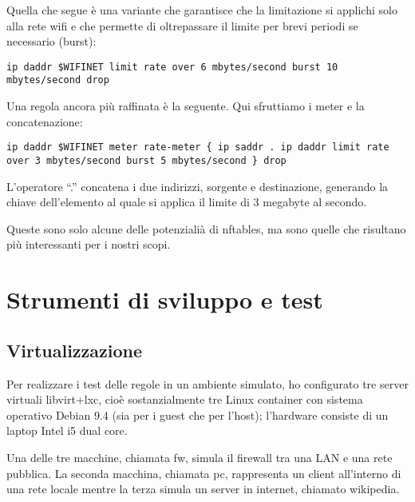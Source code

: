 \noindent Quella che segue \`e una variante che garantisce che la limitazione si applichi solo alla rete wifi e che
permette di oltrepassare il limite per brevi periodi se necessario (burst):
\begin{lstlisting}[style=customc,firstnumber=20]
ip daddr $WIFINET limit rate over 6 mbytes/second burst 10 mbytes/second drop
\end{lstlisting}
Una regola ancora pi\`u raffinata \`e la seguente. Qui sfruttiamo i meter e la concatenazione:
\begin{lstlisting}[style=customc,firstnumber=20]
ip daddr $WIFINET meter rate-meter { ip saddr . ip daddr limit rate over 3 mbytes/second burst 5 mbytes/second } drop
\end{lstlisting}
L'operatore ``.'' concatena i due indirizzi, sorgente e destinazione, generando la chiave
dell'elemento al quale si applica il limite di 3 megabyte al secondo.

Queste sono solo alcune delle potenziali\`a di nftables, ma sono quelle che
risultano pi\`u interessanti per i nostri scopi.

\chapter{Strumenti di sviluppo e test}


\section{Virtualizzazione}

Per realizzare i test delle regole in un ambiente simulato, ho configurato tre
server virtuali libvirt+lxc, cio\`e sostanzialmente tre Linux container con
sistema operativo Debian 9.4 (sia per i guest che per l'host); l'hardware
consiste di un laptop Intel i5 dual core.

Una delle tre macchine, chiamata fw, simula il firewall tra una LAN e una rete
pubblica. La seconda macchina, chiamata pc, rappresenta un client all'interno
di una rete locale mentre la terza simula un server in internet, chiamato
wikipedia.

